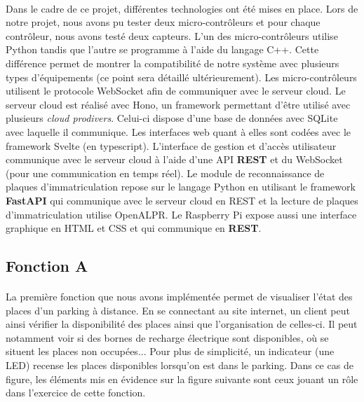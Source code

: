 \paragraph*{}
Dans le cadre de ce projet, différentes technologies ont été mises en place. Lors de notre projet, nous avons pu tester deux micro-contrôleurs et pour chaque contrôleur, nous avons testé deux capteurs. L'un des micro-contrôleurs utilise Python tandis que l'autre se programme à l'aide du langage C++. Cette différence permet de montrer la compatibilité de notre système avec plusieurs types d'équipements (ce point sera détaillé ultérieurement). Les micro-contrôleurs utilisent le protocole WebSocket afin de communiquer avec le serveur cloud. Le serveur cloud est réalisé avec Hono, un framework permettant d'être utilisé avec plusieurs \textit{cloud prodivers}. Celui-ci dispose d'une base de données avec SQLite avec laquelle il communique. Les interfaces web quant à elles sont codées avec le framework Svelte (en typescript). L'interface de gestion et d'accès utilisateur communique avec le serveur cloud à l'aide d'une API \textbf{REST} et du WebSocket (pour une communication en temps réel). Le module de reconnaissance de plaques d'immatriculation repose sur le langage Python en utilisant le framework \textbf{FastAPI} qui communique avec le serveur cloud en REST et la lecture de plaques d'immatriculation utilise OpenALPR. Le Raspberry Pi expose aussi une interface graphique en HTML et CSS et qui communique en \textbf{REST}.


\clearpage
\subsection{Fonction A}

\paragraph*{}
La première fonction que nous avons implémentée permet de visualiser l'état des places d'un parking à distance. En se connectant au site internet, un client peut ainsi vérifier la disponibilité des places ainsi que l'organisation de celles-ci. Il peut notamment voir si des bornes de recharge électrique sont disponibles, où se situent les places non occupées... Pour plus de simplicité, un indicateur (une LED) recense les places disponibles lorsqu'on est dans le parking. Dans ce cas de figure, les éléments mis en évidence sur la figure suivante sont ceux jouant un rôle dans l'exercice de cette fonction.

